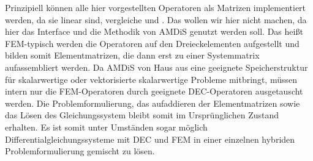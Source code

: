   \begin{bemerkung}
    Prinzipiell können alle hier vorgestellten Operatoren als Matrizen implementiert werden, da sie linear sind, vergleiche \cite{siggraphKap7} und \cite{siggraphKap8}.
    Das wollen wir hier nicht machen, da hier das Interface und die Methodik von AMDiS genutzt werden soll.
    Das heißt FEM-typisch werden die Operatoren auf den Dreieckelementen aufgestellt und bilden somit Elementmatrizen, die dann erst zu einer Systemmatrix aufassembliert werden.
    Da AMDiS von Haus aus eine geeignete Speicherstruktur für skalarwertige oder vektorisierte skalarwertige Probleme mitbringt, müssen intern nur die FEM-Operatoren durch geeignete
    DEC-Operatoren ausgetauscht werden.
    Die Problemformulierung, das aufaddieren der Elementmatrizen sowie das Lösen des Gleichungssystem bleibt somit im Ursprünglichen Zustand erhalten.
    Es ist somit unter Umständen sogar möglich Differentialgleichungssysteme mit DEC und FEM in einer einzelnen 
    hybriden Problemformulierung gemischt zu lösen.
  \end{bemerkung}

